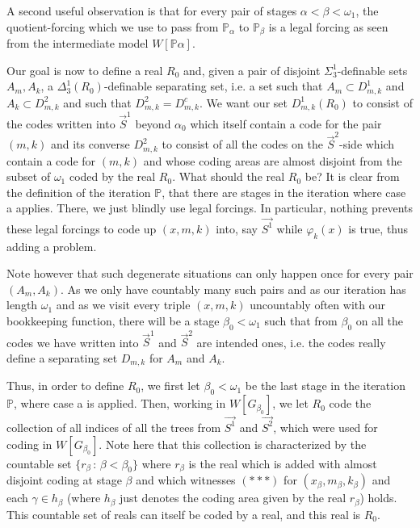 \documentclass[a4paper,11pt]{article}
\newcommand{\forceP}{\mathbb{P}}
\begin{document}
A second useful observation is that for every pair of stages $\alpha <\beta < \omega_1$, the quotient-forcing which we use to pass from $\forceP_{\alpha}$ to $\forceP_{\beta}$ is a legal forcing as seen from the intermediate model $W[\forceP\alpha]$.  

Our goal is now to define a real $R_0$ and, given a pair of disjoint $\Sigma^1_3$-definable sets $A_m,A_k$, a $\Delta^1_3(R_0)$-definable separating set, i.e. a set such that $A_m \subset D^1_{m,k}$ and $A_k \subset D_{m,k}^2$ and such that $D_{m,k}^2=D_{m,k}^c$.
We want our set $D^1_{m,k} (R_0)$ to consist of the codes written into $\vec{S}^1$ beyond $\alpha_0$ which itself contain a code for the pair $(m,k)$ and its converse $D_{m,k}^2$ to consist of all the codes on the $\vec{S}^2$-side  which contain a code for $(m,k)$ and whose coding areas are almost disjoint from the subset of $\omega_1$ coded by the real $R_0$. What should the real $R_0$ be?
It is clear from the definition of the iteration $\forceP$, that there are stages in the iteration where case a applies.  There, we just blindly use legal forcings. In particular, nothing prevents these legal forcings to code up $(x,m,k)$ into, say $\vec{S^1}$ while $\varphi_k(x)$ is true, thus adding a problem.

Note however that such degenerate situations can only happen once for every pair $(A_m,A_k)$. As we only have countably many such pairs and as our iteration has length $\omega_1$ and as we visit every triple $(x,m,k)$ uncountably often with our bookkeeping function, there will be a stage $\beta_0 < \omega_1$ such that from $\beta_0$ on all the codes we have written into $\vec{S}^1$ and $\vec{S}^2$ are intended ones, i.e. the codes really define a separating set $D_{m,k}$ for $A_m$ and $A_k$.

Thus, in order to define $R_0$, we first let $\beta_0 < \omega_1$ be the last stage in the iteration $\forceP$, where case a is applied. Then, working in $W[G_{\beta_0}]$, we let $R_0$ code the collection of all indices of all the trees from $\vec{S^1}$ and $\vec{S^2}$, which were used for coding in $W[G_{\beta_0}]$. Note here that this collection is characterized by the countable set $\{ r_{\beta} \, : \, \beta < \beta_0\}$ where $r_{\beta}$ is the real which is added with almost disjoint coding at stage $\beta$ and which witnesses $( {\ast} {\ast} {\ast} )$ for $(x_{\beta},m_{\beta},k_{\beta})$ and each $\gamma \in h_{\beta}$ (where $h_{\beta}$ just denotes the coding area given by the real $r_{\beta}$) holds. This countable set of reals can itself be coded by a real, and this real is $R_0$.
\end{document}
